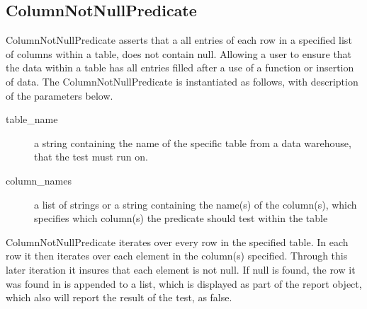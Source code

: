 \subsection{ColumnNotNullPredicate}
ColumnNotNullPredicate asserts that a all entries of each row in a specified list of columns within a table, does not contain null. Allowing a user to ensure that the data within a table has all entries filled after a use of a function or insertion of data.
The ColumnNotNullPredicate is instantiated as follows, with description of the parameters below.


\begin{description}
\item [table\_name] a string containing the name of the specific table from a data warehouse, that the test must run on. 
\item [column\_names] a list of strings or a string containing the name(s) of the column(s), which specifies which column(s) the predicate should test within the table
\end{description}

ColumnNotNullPredicate iterates over every row in the specified table. In each row it then iterates over each element in the column(s) specified. Through this later iteration it insures that each element is not null. If null is found, the row it was found in is appended to a list, which is displayed as part of the report object, which also will report the result of the test, as false.